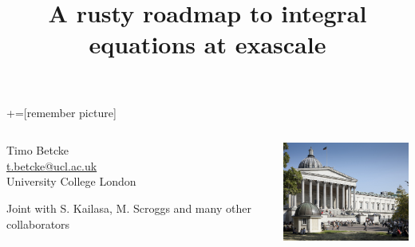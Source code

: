 \documentclass[dvipsnames,10pt]{beamer}
\title{A rusty roadmap to integral equations at exascale}
\date{}
\begin{document}
\lstset{language=Python}
+=[remember picture]
\begin{frame}

\vspace{1cm}

\titlepage
\vspace{-2cm}
\begin{columns}[T]
\begin{column}{.48\textwidth}
\begin{center}
    Timo Betcke \\
    \url{t.betcke@ucl.ac.uk}\\
    University College London
\end{center}
\begin{tcolorbox}
Joint with S. Kailasa, M. Scroggs and many
other collaborators
\end{tcolorbox}
\end{column}%
\hfill%
\begin{column}{.48\textwidth}
\includegraphics[width=5cm]{../figs/ucl_campus}

\end{column}%
\end{columns}

\end{frame}
\end{document}
